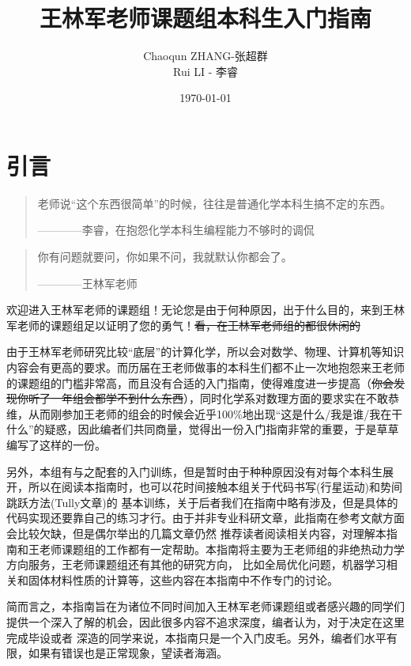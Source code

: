 \documentclass{article}
\title{王林军老师课题组本科生入门指南}
\author{Chaoqun ZHANG-张超群\\Rui LI - 李睿}
\date{\today}
\numberwithin{equation}{section}
\begin{document}
    \maketitle
    \tableofcontents
    \newpage
    \section{引言}
  \begin{quote}
    老师说``这个东西很简单''的时候，往往是普通化学本科生搞不定的东西。
    \begin{flushright}
      ————李睿，在抱怨化学本科生编程能力不够时的调侃
    \end{flushright}
  \end{quote}
  \begin{quote}
    你有问题就要问，你如果不问，我就默认你都会了。
    \begin{flushright}
      ————王林军老师
    \end{flushright}
  \end{quote}

  欢迎进入王林军老师的课题组！无论您是由于何种原因，出于什么目的，来到王林军老师的课题组足以证明了您的勇气！\sout{看，在王林军老师组的都很休闲的}

  由于王林军老师研究比较``底层''的计算化学，所以会对数学、物理、计算机等知识内容会有更高的要求。而历届在王老师做事的本科生们都不止一次地抱怨来王老师的课题组的门槛非常高，而且没有合适的入门指南，使得难度进一步提高（\sout{你会发现你听了一年组会都学不到什么东西}），同时化学系对数理方面的要求实在不敢恭维，从而刚参加王老师的组会的时候会近乎100\%地出现``这是什么/我是谁/我在干什么''的疑惑，因此编者们共同商量，觉得出一份入门指南非常的重要，于是草草编写了这样的一份。

  另外，本组有与之配套的入门训练，但是暂时由于种种原因没有对每个本科生展开，所以在阅读本指南时，也可以花时间接触本组关于代码书写(行星运动)和势间跳跃方法(Tully文章)的
  基本训练，关于后者我们在指南中略有涉及，但是具体的代码实现还要靠自己的练习才行。由于并非专业科研文章，此指南在参考文献方面会比较欠缺，但是偶尔举出的几篇文章仍然
  推荐读者阅读相关内容，对理解本指南和王老师课题组的工作都有一定帮助。本指南将主要为王老师组的非绝热动力学方向服务，王老师课题组还有其他的研究方向，
  比如全局优化问题，机器学习相关和固体材料性质的计算等，这些内容在本指南中不作专门的讨论。
  
  简而言之，本指南旨在为诸位不同时间加入王林军老师课题组或者感兴趣的同学们提供一个深入了解的机会，因此很多内容不追求深度，编者认为，对于决定在这里完成毕设或者
  深造的同学来说，本指南只是一个入门皮毛。另外，编者们水平有限，如果有错误也是正常现象，望读者海涵。
\end{document}
